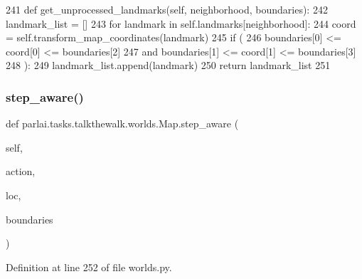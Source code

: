 \begin{DoxyCode}
241     \textcolor{keyword}{def }get\_unprocessed\_landmarks(self, neighborhood, boundaries):
242         landmark\_list = []
243         \textcolor{keywordflow}{for} landmark \textcolor{keywordflow}{in} self.landmarks[neighborhood]:
244             coord = self.transform\_map\_coordinates(landmark)
245             \textcolor{keywordflow}{if} (
246                 boundaries[0] <= coord[0] <= boundaries[2]
247                 \textcolor{keywordflow}{and} boundaries[1] <= coord[1] <= boundaries[3]
248             ):
249                 landmark\_list.append(landmark)
250         \textcolor{keywordflow}{return} landmark\_list
251 
\end{DoxyCode}
\mbox{\label{classparlai_1_1tasks_1_1talkthewalk_1_1worlds_1_1Map_a3c59a7fa515ceefb772da1f807021b85}} 
\subsubsection{\texorpdfstring{step\+\_\+aware()}{step\_aware()}}
{\footnotesize\ttfamily def parlai.\+tasks.\+talkthewalk.\+worlds.\+Map.\+step\+\_\+aware (\begin{DoxyParamCaption}\item[{}]{self,  }\item[{}]{action,  }\item[{}]{loc,  }\item[{}]{boundaries }\end{DoxyParamCaption})}



Definition at line 252 of file worlds.\+py.


